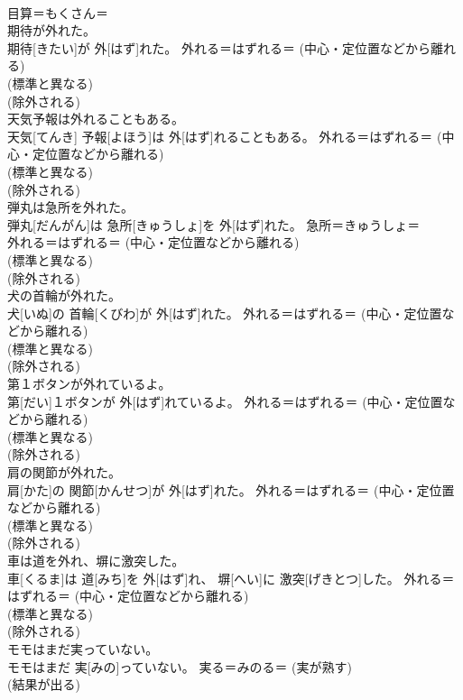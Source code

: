 \documentclass[8pt]{extreport}
\begin{document}
\begin{CJK}{UTF8}{min}
{\\	目算＝もくさん＝ 
\\	期待が外れた。	
\\	期待[きたい]が 外[はず]れた。	外れる＝はずれる＝ (中心・定位置などから離れる) 
\\	(標準と異なる) 
\\	(除外される) 
\\	天気予報は外れることもある。	
\\	天気[てんき] 予報[よほう]は 外[はず]れることもある。	外れる＝はずれる＝ (中心・定位置などから離れる) 
\\	(標準と異なる) 
\\	(除外される) 
\\	弾丸は急所を外れた。	
\\	弾丸[だんがん]は 急所[きゅうしょ]を 外[はず]れた。	急所＝きゅうしょ＝ 
\\	外れる＝はずれる＝ (中心・定位置などから離れる) 
\\	(標準と異なる) 
\\	(除外される) 
\\	犬の首輪が外れた。	
\\	犬[いぬ]の 首輪[くびわ]が 外[はず]れた。	外れる＝はずれる＝ (中心・定位置などから離れる) 
\\	(標準と異なる) 
\\	(除外される) 
\\	第１ボタンが外れているよ。	
\\	第[だい]１ボタンが 外[はず]れているよ。	外れる＝はずれる＝ (中心・定位置などから離れる) 
\\	(標準と異なる) 
\\	(除外される) 
\\	肩の関節が外れた。	
\\	肩[かた]の 関節[かんせつ]が 外[はず]れた。	外れる＝はずれる＝ (中心・定位置などから離れる) 
\\	(標準と異なる) 
\\	(除外される) 
\\	車は道を外れ、塀に激突した。	
\\	車[くるま]は 道[みち]を 外[はず]れ、 塀[へい]に 激突[げきとつ]した。	外れる＝はずれる＝ (中心・定位置などから離れる) 
\\	(標準と異なる) 
\\	(除外される) 
\\	モモはまだ実っていない。	
\\	モモはまだ 実[みの]っていない。	実る＝みのる＝ (実が熟す) 
\\	(結果が出る) 
}
\end{CJK}
\end{document}
